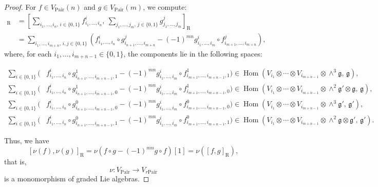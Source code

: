\documentclass[12pt]{amsart}
\theoremstyle{definition}
\begin{document}
	\begin{proof}
	For \(f \in V_{\mathrm{Pair}}(n)\) and \(g \in V_{\mathrm{Pair}}(m)\), we compute:
	\begin{align*}
		[\nu(f), \nu(g)]_{\mathrm{R}}
		&= \left[ \sum_{i_1,\ldots,i_n,\, i \in \{0,1\}} f_{i_1,\ldots,i_n}^i,\
		\sum_{j_1,\ldots,j_m,\, j \in \{0,1\}} g_{j_1,\ldots,j_m}^j \right]_{\mathrm{R}} \\
		&= \sum_{i_1,\ldots,i_{m+n},\, i, j \in \{0,1\}}
		\left( f_{i_1,\ldots,i_n}^i \circ g_{i_{n+1},\ldots,i_{m+n}}^j
		- (-1)^{mn} g_{i_1,\ldots,i_m}^i \circ f_{i_{m+1},\ldots,i_{m+n}}^j \right),
	\end{align*}
	where, for each \(i_1, \ldots, i_{m+n-1} \in \{0,1\}\), the components lie in the following spaces:
	\begin{small}
\begin{align*}
		\sum_{i \in \{0,1\}} \Big(
		&f_{i_1,\ldots,i_n}^i \circ g_{i_{n+1},\ldots,i_{m+n-1},1}^1
		- (-1)^{mn} g_{i_1,\ldots,i_m}^i \circ f_{i_{m+1},\ldots,i_{m+n-1},1}^1 \Big)
		\in \operatorname{Hom}\left( V_{i_1} \otimes \cdots \otimes V_{i_{m+n-1}} \otimes \wedge^3 \mathfrak{g},\, \mathfrak{g} \right), \\
		\sum_{i \in \{0,1\}} \Big(
		&f_{i_1,\ldots,i_n}^i \circ g_{i_{n+1},\ldots,i_{m+n-1},0}^1
		- (-1)^{mn} g_{i_1,\ldots,i_m}^i \circ f_{i_{m+1},\ldots,i_{m+n-1},0}^1 \Big)
		\in \operatorname{Hom}\left( V_{i_1} \otimes \cdots \otimes V_{i_{m+n-1}} \otimes \wedge^2 \mathfrak{g}' \otimes \mathfrak{g},\, \mathfrak{g} \right), \\
		\sum_{i \in \{0,1\}} \Big(
		&f_{i_1,\ldots,i_n}^i \circ g_{i_{n+1},\ldots,i_{m+n-1},0}^0
		- (-1)^{mn} g_{i_1,\ldots,i_m}^i \circ f_{i_{m+1},\ldots,i_{m+n-1},0}^0 \Big)
		\in \operatorname{Hom}\left( V_{i_1} \otimes \cdots \otimes V_{i_{m+n-1}} \otimes \wedge^3 \mathfrak{g}',\, \mathfrak{g}' \right), \\
		\sum_{i \in \{0,1\}} \Big(
		&f_{i_1,\ldots,i_n}^i \circ g_{i_{n+1},\ldots,i_{m+n-1},1}^0
		- (-1)^{mn} g_{i_1,\ldots,i_m}^i \circ f_{i_{m+1},\ldots,i_{m+n-1},1}^0 \Big)
		\in \operatorname{Hom}\left( V_{i_1} \otimes \cdots \otimes V_{i_{m+n-1}} \otimes \wedge^2 \mathfrak{g} \otimes \mathfrak{g}',\, \mathfrak{g}' \right).
	\end{align*}
\end{small}
Thus, we have
\[
[ \nu(f) , \nu(g)]_{\mathrm{R}}  = \nu\left( f\circ g - (-1)^{mn} g\circ f \right)[1] = \nu \left( [f,g]_{\mathrm{R}} \right),
\]
that is,
\[
\nu \colon V_{\mathrm{Pair}} \rightarrow V_{r\mathrm{Pair}}
\]
is a monomorphism of graded Lie algebras.
	\end{proof}
\end{document}
